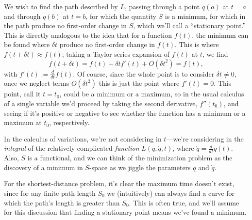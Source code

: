 \documentclass[12pt]{article}
\newcommand{\md}{d}
\newcommand{\mderiv}[1]{\frac{\md}{\md {#1}}} %
\newcommand{\mvar}{t}
\begin{document}
We wish to find the path described by $L$, passing through a point $q(a)$ at $\mvar=a$ and through $q(b)$ at $\mvar=b$, for which the quantity $S$ is a minimum, for which  in the path produce no first-order change in $S$, which we'll call a ``stationary point.''  This is directly analogous to the idea that for a function $f(t)$, the minimum can be found where  $\delta t$ produce no first-order change in $f(t)$.  This is where $f(t + \delta t) \approx f(t)$; taking a Taylor series expansion of $f(t)$ at $t$, we find
\begin{equation}
f(t + \delta t) = f(t) + \delta t f'(t) + O({\delta t}^2) = f(t),
\end{equation}
with $f'(t) := \mderiv{t}{f(t)}$.  Of course, since the whole point is to consider $\delta t \neq 0$, once we neglect terms $O({\delta t}^2)$ this is just the point where $f'(t) = 0$.  This point, call it $t = t_0$, could be a minimum or a maximum, so in the usual calculus of a single variable we'd proceed by taking the second derivative, $f''(t_0)$, and seeing if it's positive or negative to see whether the function has a minimum or a maximum at $t_0$, respectively.

In the calculus of variations, we're not considering  in $t$---we're considering  in the \emph{integral} of the relatively complicated \emph{function} $L(q,\dot{q}, \mvar)$, where $\dot{q} = \mderiv{\mvar}{q(\mvar)}$.  Also, $S$ is a functional, and we can think of the minimization problem as the discovery of a minimum in $S$-space as we jiggle the parameters $q$ and $\dot{q}$.

For the shortest-distance problem, it's clear the maximum time doesn't exist, since for any finite path length $S_0$ we (intuitively) can always find a curve for which the path's length is greater than $S_0$.  This is often true, and we'll assume for this discussion that finding a stationary point means we've found a minimum.
\end{document}
